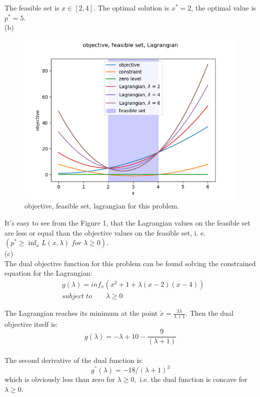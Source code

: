 \documentclass{article}
\begin{document}
The feasible set is $x \in [2, 4] $. The optimal solution is 
$x^* = 2$, the optimal value is $p^* = 5.$ \\

(b)\\
\begin{figure}[h!]
	\includegraphics[width=\linewidth]{5_1_b_1.png}
	\caption{objective, feasible set, lagrangian for this problem.}
	\label{fig:5_1_b_1}
\end{figure}

It's easy to see from the Figure 1, that the Lagrangian values on the feasible set are less or equal than the objective values on the feasible set, 
i. e. \\ 
$(p^* \geq \inf_x L(x, \lambda) \;for\; \lambda \geq 0 ).$ \\

(c)\\
The dual objective function for this problem can be found solving the constrained equation for the Lagrangian: \\

\begin{align*}
&g(\lambda) = inf_{x} (x^2 + 1 + \lambda (x - 2)(x - 4))\\
&subject \; to  \qquad \lambda \geq 0
\end{align*} 

The Lagrangian reaches its minimum at the point 
$\tilde x = \frac{3 \lambda}{\lambda + 1}.$
Then the dual objective itself is: \\
$$g(\lambda) = - \lambda + 10 - \frac{9}{(\lambda + 1)}$$ \\
The second derivative of the dual function is:\\
$$g^{''}(\lambda) = - 18 / (\lambda + 1)^3$$
which is obviously less than zero for $\lambda \geq 0,$ i.e. the dual function is concave for $\lambda \geq 0.$
\end{document}
